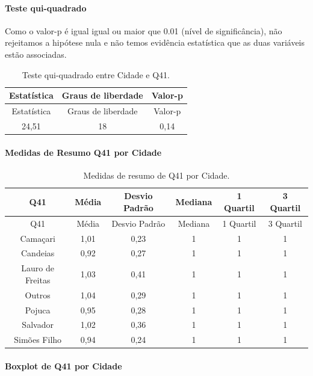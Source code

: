 \documentclass[]{article}
\let\oldparagraph\paragraph
\renewcommand{\paragraph}[1]{\oldparagraph{#1}\mbox{}}
\begin{document}
\hypertarget{teste-qui-quadrado-137}{%
\paragraph{Teste qui-quadrado}\label{teste-qui-quadrado-137}}

Como o valor-p é igual igual ou maior que 0.01 (nível de significância), não rejeitamos a hipótese nula e não temos evidência estatística que as duas variáveis estão associadas.

\begin{longtable}[]{@{}ccc@{}}
\caption{\label{tab:unnamed-chunk-1609}Teste qui-quadrado entre Cidade e Q41.}\tabularnewline
\toprule
Estatística & Graus de liberdade & Valor-p\tabularnewline
\midrule
\endfirsthead
\toprule
Estatística & Graus de liberdade & Valor-p\tabularnewline
\midrule
\endhead
24,51 & 18 & 0,14\tabularnewline
\bottomrule
\end{longtable}

\cleardoublepage

\hypertarget{medidas-de-resumo-q41-por-cidade}{%
\paragraph{Medidas de Resumo Q41 por Cidade}\label{medidas-de-resumo-q41-por-cidade}}

\begin{longtable}[]{@{}cccccc@{}}
\caption{\label{tab:unnamed-chunk-1610}Medidas de resumo de Q41 por Cidade.}\tabularnewline
\toprule
Q41 & Média & Desvio Padrão & Mediana & 1 Quartil & 3 Quartil\tabularnewline
\midrule
\endfirsthead
\toprule
Q41 & Média & Desvio Padrão & Mediana & 1 Quartil & 3 Quartil\tabularnewline
\midrule
\endhead
Camaçari & 1,01 & 0,23 & 1 & 1 & 1\tabularnewline
Candeias & 0,92 & 0,27 & 1 & 1 & 1\tabularnewline
Lauro de Freitas & 1,03 & 0,41 & 1 & 1 & 1\tabularnewline
Outros & 1,04 & 0,29 & 1 & 1 & 1\tabularnewline
Pojuca & 0,95 & 0,28 & 1 & 1 & 1\tabularnewline
Salvador & 1,02 & 0,36 & 1 & 1 & 1\tabularnewline
Simões Filho & 0,94 & 0,24 & 1 & 1 & 1\tabularnewline
\bottomrule
\end{longtable}

\hypertarget{boxplot-de-q41-por-cidade}{%
\paragraph{Boxplot de Q41 por Cidade}\label{boxplot-de-q41-por-cidade}}
\end{document}
